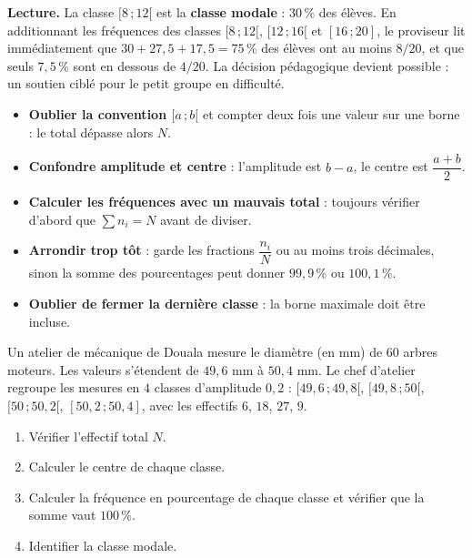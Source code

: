 \documentclass[11pt]{article}
\begin{document}
\begin{exoresolu}
\textbf{Lecture.} La classe $[8\,;12[$ est la \textbf{classe modale} : $30\,\%$ des élèves. En additionnant les fréquences des classes $[8\,;12[$, $[12\,;16[$ et $[16\,;20]$, le proviseur lit immédiatement que $30 + 27,5 + 17,5 = 75\,\%$ des élèves ont au moins $8/20$, et que seuls $7,5\,\%$ sont en dessous de $4/20$. La décision pédagogique devient possible : un soutien ciblé pour le petit groupe en difficulté.
\end{exoresolu}

\begin{attention}
\begin{itemize}
\item \textbf{Oublier la convention $[a\,;b[$} et compter deux fois une valeur sur une borne : le total dépasse alors $N$.
\item \textbf{Confondre amplitude et centre} : l'amplitude est $b-a$, le centre est $\dfrac{a+b}{2}$.
\item \textbf{Calculer les fréquences avec un mauvais total} : toujours vérifier d'abord que $\sum n_i = N$ avant de diviser.
\item \textbf{Arrondir trop tôt} : garde les fractions $\dfrac{n_i}{N}$ ou au moins trois décimales, sinon la somme des pourcentages peut donner $99,9\,\%$ ou $100,1\,\%$.
\item \textbf{Oublier de fermer la dernière classe} : la borne maximale doit être incluse.
\end{itemize}
\end{attention}

\begin{exercice}
Un atelier de mécanique de Douala mesure le diamètre (en mm) de $60$ arbres moteurs. Les valeurs s'étendent de $49{,}6$ mm à $50{,}4$ mm. Le chef d'atelier regroupe les mesures en $4$ classes d'amplitude $0{,}2$ : $[49,6\,;49,8[$, $[49,8\,;50[$, $[50\,;50,2[$, $[50,2\,;50,4]$, avec les effectifs $6$, $18$, $27$, $9$.
\begin{enumerate}
\item Vérifier l'effectif total $N$.
\item Calculer le centre de chaque classe.
\item Calculer la fréquence en pourcentage de chaque classe et vérifier que la somme vaut $100\,\%$.
\item Identifier la classe modale.
\end{enumerate}
\end{exercice}
\end{document}
